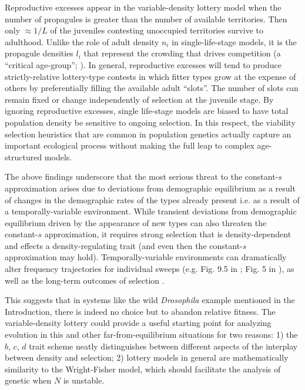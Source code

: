\documentclass[12pt]{article}
\begin{document}
Reproductive excesses appear in the variable-density lottery model when the number of propagules is greater than the number of available territories. Then only $\approx 1/L$ of the juveniles contesting unoccupied territories survive to adulthood. Unlike the role of adult density $n_i$ in single-life-stage models, it is the propagule densities $l_i$ that represent the crowding that drives competition (a ``critical age-group''; \citealt[pp. 54]{charlesworth_1994}). In general, reproductive excesses will tend to produce strictly-relative lottery-type contests in which fitter types grow at the expense of others by preferentially filling the available adult ``slots''. The number of slots can remain fixed or change independently of selection at the juvenile stage. By ignoring reproductive excesses, single life-stage models are biased to have total population density be sensitive to ongoing selection. In this respect, the viability selection heuristics that are common in population genetics \cite[pp. 61]{gillespie_2004} actually capture an important ecological process without making the full leap to complex age-structured models.

The above findings underscore that the most serious threat to the constant-$s$ approximation arises due to deviations from demographic equilibrium as a result of changes in the demographic rates of the types already present i.e. as a result of a temporally-variable environment. While transient deviations from demographic equilibrium driven by the appearance of new types can also threaten the constant-$s$ approximation, it requires strong selection that is density-dependent and effects a density-regulating trait (and even then the constant-$s$ approximation may hold). Temporally-variable environments can dramatically alter frequency trajectories for individual sweeps (e.g. Fig. 9.5 in \cite{otto_2011}; Fig. 5 in \cite{mallet_2012}), as well as the long-term outcomes of selection \citep{lande_2009}. 

This suggests that in systems like the wild \textit{Drosophila} example mentioned in the Introduction, there is indeed no choice but to abandon relative fitness. The variable-density lottery could provide a useful starting point for analyzing evolution in this and other far-from-equilibrium situations for two reasons: 1) the $b$, $c$, $d$ trait scheme neatly distinguishes between different aspects of the interplay between density and selection; 2)  lottery models in general are mathematically similarity to the Wright-Fisher model, which should facilitate the analysis of genetic when $N$ is unstable.
\end{document}
